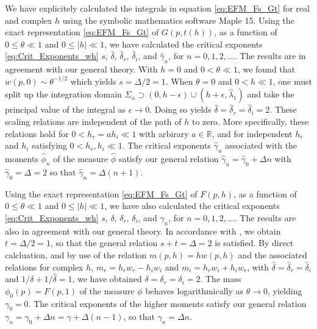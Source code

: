 \documentclass[english,12pt,jmp,graphicx]{revtex4-1}
\newcommand{\ph}{\hat{\phi}}
\newcommand{\gh}{\hat{\gamma}}
\newcommand{\dha}{\hat{\delta}}
\begin{document}
We have explicitely calculated the integrals in equation 
\eqref{eq:EFM_Fs_Gt} for real and complex $h$ using the symbolic
mathematics software Maple 15. Using the exact representation
\eqref{eq:EFM_Fs_Gt} of $G(p,t(h))$, as a function of $0\leq\theta\ll1$ and
$0\leq|h|\ll1$, we have calculated the critical exponents
\eqref{eq:Crit_Exponents_wh} $s$, $\dha$, $\dha_r$, $\dha_i$, and
$\gh_n$, for $n=0,1,2,\ldots$. The results are in agreement with our
general theory. With $h=0$ and $0<\theta\ll1$, we found that
$w(p,0)\sim\theta^{-1/2}$ which yields $s=\Delta/2=1$. When $\theta=0$ and $0<h\ll1$, one 
must split up the integration domain $\Sigma_\alpha\supset(0,h-\epsilon)\cup(h+\epsilon,\hat{\lambda}_1)$ and
take the principal value of the integral as $\epsilon\to0$. Doing so yields
$\dha=\dha_r=\dha_i=2$. These scaling relations are
independent of the path of $h$ to zero. More specifically, these
relations hold for $0<h_r=ah_i\ll1$ with arbirary $a\in\mathbb{R}$, and for
independent $h_r$ and $h_i$ satisfying $0<h_r,h_i\ll1$. The critical
exponents $\gh_n$ associated with the moments $\ph_n$ of the measure
$\ph$ satisfy our general relation $\gh_n=\gh_0+\Delta n$ with $\gh_0=\Delta=2$
so that $\gh_n=\Delta(n+1)$.%

Using the exact representation \eqref{eq:EFM_Fs_Gt} of $F(p,h)$, as a
function of $0\leq\theta\ll1$ and $0\leq|h|\ll1$, we have also calculated the
critical exponents \eqref{eq:Crit_Exponents_wh} $s$, $\delta$, $\delta_r$,
$\delta_i$, and $\gamma_n$, for $n=0,1,2,\ldots$. The results are also in agreement
with our general theory. In accordance with \cite{Day:JPCM-96}, we
obtain $t=\Delta/2=1$, so that the general relation $s+t=\Delta=2$ is
satisfied. By direct calcluation, and by use of the relation 
$m(p,h)=hw(p,h)$ and the associated relations for complex $h$,
$m_r=h_rw_r-h_iw_i$ and $m_i=h_rw_i+h_iw_r$, with $\dha=\dha_r=\dha_i$
and $1/\delta+1/\dha=1$, we have obtained  $\delta=\delta_r=\delta_i=2$.
The mass $\phi_0(p)=F(p,1)$ of the measure $\phi$ behaves
logarithmically as $\theta\to0$, yielding $\gamma_0=0$. The critical exponents of
the higher moments satisfy our general relation
$\gamma_n=\gamma_0+\Delta n=\gamma+\Delta(n-1)$, so that $\gamma_n=\Delta n$.%
%
\end{document}
